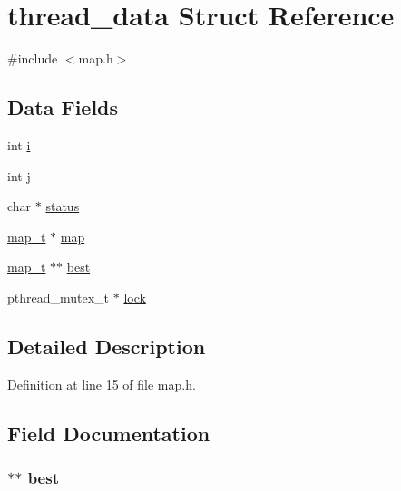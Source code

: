 \hypertarget{structthread__data}{\section{thread\-\_\-data Struct Reference}
\label{structthread__data}
}


{\ttfamily \#include $<$map.\-h$>$}

\subsection*{Data Fields}
\begin{DoxyCompactItemize}
\item 
int \hyperlink{structthread__data_acb559820d9ca11295b4500f179ef6392}{i}
\item 
int \hyperlink{structthread__data_a37d972ae0b47b9099e30983131d31916}{j}
\item 
char $\ast$ \hyperlink{structthread__data_a3cbe9fdcd03667b9bc176454129f4d52}{status}
\item 
\hyperlink{structmap__t}{map\-\_\-t} $\ast$ \hyperlink{structthread__data_af2bb9dc718068dc88b8250185d0d6ab7}{map}
\item 
\hyperlink{structmap__t}{map\-\_\-t} $\ast$$\ast$ \hyperlink{structthread__data_a77a326eb02de810d68fcb0dcb2de6ea4}{best}
\item 
pthread\-\_\-mutex\-\_\-t $\ast$ \hyperlink{structthread__data_a33586b4184d23f2b8f4df153ec23af13}{lock}
\end{DoxyCompactItemize}


\subsection{Detailed Description}


Definition at line 15 of file map.\-h.



\subsection{Field Documentation}
\hypertarget{structthread__data_a77a326eb02de810d68fcb0dcb2de6ea4}{
\subsubsection[{best}]{$\ast$$\ast$ best}}\label{structthread__data_a77a326eb02de810d68fcb0dcb2de6ea4}



